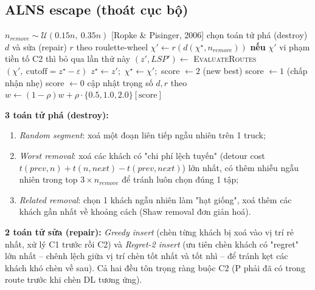 \documentclass[12pt,a4paper]{article}
\begin{document}
\subsection{ALNS escape (thoát cục bộ)}

\begin{algorithm}[H]
\caption{ALNS escape (gọi khi Tabu Search trì trệ)}\label{alg:alns}
\begin{algorithmic}[1]
\STATE $n_{remove} \sim \mathcal{U}(0.15n,\ 0.35n)$ [Ropke \& Pisinger, 2006]
    \STATE chọn toán tử phá (destroy) $d$ và sửa (repair) $r$ theo roulette-wheel
    \STATE $\chi' \leftarrow r(d(\chi^\star, n_{remove}))$
    \STATE \textbf{nếu} $\chi'$ vi phạm tiền tố C2 thì bỏ qua lần thử này
    \STATE $(z', LSP') \leftarrow$ \textsc{EvaluateRoutes}$(\chi',\ \text{cutoff}=z^\star-\varepsilon)$
        \STATE $z^\star \leftarrow z'$;\ $\chi^\star \leftarrow \chi'$;\ score $\leftarrow 2$ (new best)
        \STATE score $\leftarrow 1$ (chấp nhận nhẹ)
    \ELSE
        \STATE score $\leftarrow 0$
    \ENDIF
    \STATE cập nhật trọng số $d, r$ theo $w \leftarrow (1-\rho)w + \rho\cdot\{0.5,1.0,2.0\}[\text{score}]$
\ENDFOR
\end{algorithmic}
\end{algorithm}

\textbf{3 toán tử phá (destroy):}
\begin{enumerate}
    \item \textit{Random segment}: xoá một đoạn liên tiếp ngẫu nhiên trên 1 truck;
    \item \textit{Worst removal}: xoá các khách có "chi phí lệch tuyến" (detour cost
    $t(prev,n){+}t(n,next){-}t(prev,next)$) lớn nhất, có thêm nhiễu ngẫu nhiên trong
    top $3\times n_{remove}$ để tránh luôn chọn đúng 1 tập;
    \item \textit{Related removal}: chọn 1 khách ngẫu nhiên làm "hạt giống", xoá thêm
    các khách gần nhất về khoảng cách (Shaw removal đơn giản hoá).
\end{enumerate}
\textbf{2 toán tử sửa (repair):} \textit{Greedy insert} (chèn từng khách bị xoá vào
vị trí rẻ nhất, xử lý C1 trước rồi C2) và \textit{Regret-2 insert} (ưu tiên chèn
khách có "regret" lớn nhất -- chênh lệch giữa vị trí chèn tốt nhất và tốt nhì -- để
tránh kẹt các khách khó chèn về sau). Cả hai đều tôn trọng ràng buộc C2 (P phải đã có
trong route trước khi chèn DL tương ứng).
\end{document}
